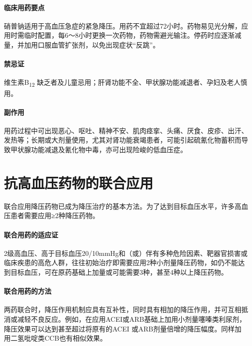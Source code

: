 \paragraph{临床用药要点}

硝普钠适用于高血压急症的紧急降压。用药不宜超过72小时。药物易见光分解，应用时需临时配置，每6～8小时更换一次药物，药物需避光输注。停药时应逐渐减量，并加用口服血管扩张剂，以免出现症状“反跳”。

\paragraph{禁忌证}

维生素B\textsubscript{12}
缺乏者及儿童忌用；肝肾功能不全、甲状腺功能减退者、孕妇及老人慎用。

\paragraph{副作用}

用药过程中可出现恶心、呕吐、精神不安、肌肉痉挛、头痛、厌食、皮疹、出汗、发热等；长期或大剂量使用，尤其对肾功能衰竭患者，可能引起硫氰化物蓄积而导致甲状腺功能减退及氰化物中毒，亦可出现险峻的低血压症。

\protect\hypertarget{text00417.html}{}{}

\section{抗高血压药物的联合应用}

联合应用降压药物已成为降压治疗的基本方法。为了达到目标血压水平，许多高血压患者需要应用≥2种降压药物。

\paragraph{联合用药的适应证}

2级高血压、高于目标血压20/10mmHg和（或）伴有多种危险因素、靶器官损害或临床疾患的高危人群，往往初始治疗即需要应用2种小剂量降压药物，如仍不能达到目标血压，可在原药基础上加量或可能需要3种，甚至4种以上降压药物。

\paragraph{联合用药的方法}

两药联合时，降压作用机制应具有互补性，同时具有相加的降压作用，并可互相抵消或减轻不良反应。例如，在应用ACEI或ARB基础上加用小剂量噻嗪类利尿剂，降压效果可以达到甚至超过将原有的ACEI
或ARB剂量倍增的降压幅度。同样加用二氢吡啶类CCB也有相似效果。

